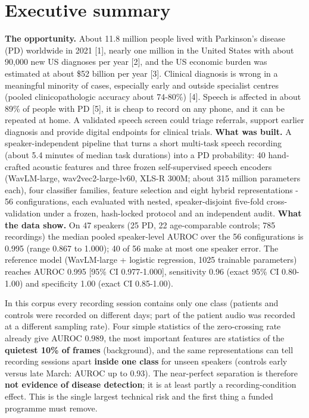\documentclass[10pt,a4paper]{article}
\begin{document}
\section{Executive summary}\label{sec:exec}
\textbf{The opportunity.} About 11.8 million people lived with Parkinson's disease (PD) worldwide in 2021 [1], nearly one million in the United States with about 90,000 new US diagnoses per year [2], and the US economic burden was estimated at about \$52 billion per year [3]. Clinical diagnosis is wrong in a meaningful minority of cases, especially early and outside specialist centres (pooled clinicopathologic accuracy about 74-80\%) [4]. Speech is affected in about 89\% of people with PD [5], it is cheap to record on any phone, and it can be repeated at home. A validated speech screen could triage referrals, support earlier diagnosis and provide digital endpoints for clinical trials.
\textbf{What was built.} A speaker-independent pipeline that turns a short multi-task speech recording (about 5.4 minutes of median task durations) into a PD probability: 40 hand-crafted acoustic features and three frozen self-supervised speech encoders (WavLM-large, wav2vec2-large-lv60, XLS-R 300M; about 315 million parameters each), four classifier families, feature selection and eight hybrid representations - 56 configurations, each evaluated with nested, speaker-disjoint five-fold cross-validation under a frozen, hash-locked protocol and an independent audit.
\textbf{What the data show.} On 47 speakers (25 PD, 22 age-comparable controls; 785 recordings) the median pooled speaker-level AUROC over the 56 configurations is 0.995 (range 0.867 to 1.000); 40 of 56 make at most one speaker error. The reference model (WavLM-large + logistic regression, 1025 trainable parameters) reaches AUROC 0.995 [95\% CI 0.977-1.000], sensitivity 0.96 (exact 95\% CI 0.80-1.00) and specificity 1.00 (exact CI 0.85-1.00).
\begin{tcolorbox}[colback=blue!3,colframe=blue!45!black,boxrule=0.5pt,arc=2pt,left=5pt,right=5pt,top=3pt,bottom=3pt,title={\small\bfseries The critical caveat (read before the numbers)}]\small In this corpus every recording session contains only one class (patients and controls were recorded on different days; part of the patient audio was recorded at a different sampling rate). Four simple statistics of the zero-crossing rate already give AUROC 0.989, the most important features are statistics of the \textbf{quietest 10\% of frames} (background), and the same representations can tell recording sessions apart \textbf{inside one class} for unseen speakers (controls early versus late March: AUROC up to 0.93). The near-perfect separation is therefore \textbf{not evidence of disease detection}; it is at least partly a recording-condition effect. This is the single largest technical risk and the first thing a funded programme must remove.\end{tcolorbox}
\end{document}
